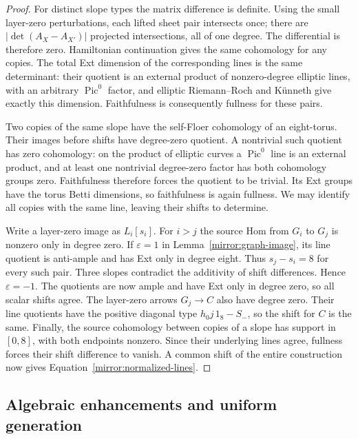 \documentclass[11pt]{article}
\theoremstyle{definition}
\theoremstyle{remark}
\numberwithin{equation}{section}
\begin{document}
\begin{proof}
For distinct slope types the matrix difference is definite.  Using
the small layer-zero perturbations, each lifted sheet pair intersects
once; there are $|\det(A_X-A_{X'})|$ projected intersections, all of
one degree.  The differential is therefore zero.  Hamiltonian
continuation gives the same cohomology for any copies.  The total
Ext dimension of the corresponding lines is the same determinant:
their quotient is an external product of nonzero-degree elliptic
lines, with an arbitrary $\operatorname{Pic}^0$ factor, and elliptic
Riemann--Roch and K\"unneth give exactly this dimension.  Faithfulness
is consequently fullness for these pairs.

Two copies of the same slope have the self-Floer cohomology of an
eight-torus.  Their images before shifts have degree-zero quotient.
A nontrivial such quotient has zero cohomology: on the product of
elliptic curves a $\operatorname{Pic}^0$ line is an external product, and at least
one nontrivial degree-zero factor has both cohomology groups zero.
Faithfulness therefore forces the quotient to be trivial.  Its Ext
groups have the torus Betti dimensions, so faithfulness is again
fullness.  We may identify all copies with the same line, leaving
their shifts to determine.

Write a layer-zero image as $L_i[s_i]$.  For $i>j$ the source Hom
from $G_i$ to $G_j$ is nonzero only in degree zero.  If
$\varepsilon=1$ in Lemma~\ref{mirror:graph-image}, its line quotient
is anti-ample and has Ext only in degree eight.  Thus
$s_j-s_i=8$ for every such pair.  Three slopes contradict the
additivity of shift differences.  Hence $\varepsilon=-1$.
The quotients are now ample and have Ext only in degree zero, so
all scalar shifts agree.  The layer-zero arrows $G_j\to C$ also
have degree zero.  Their line quotients have the positive diagonal
type $h_0j\,1_8-S_-$, so the shift for $C$ is the same.
Finally, the source cohomology between copies of a slope has support
in $[0,8]$, with both endpoints nonzero.  Since their underlying
lines agree, fullness forces their shift difference to vanish.
A common shift of the entire construction now gives
Equation~\eqref{mirror:normalized-lines}.
\end{proof}

\subsection{Algebraic enhancements and uniform generation}
\end{document}
